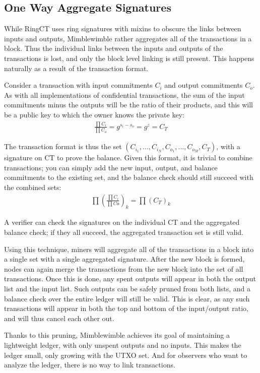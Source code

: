 \documentclass{article}
\begin{document}
\subsection{One Way Aggregate Signatures}

While RingCT uses ring signatures with mixins to obscure the links between inputs and outputs, Mimblewimble rather aggregates all of the transactions in a block.  Thus the individual links between the inputs and outputs of the transactions is lost, and only the block level linking is still present.  This happens naturally as a result of the transaction format.

Consider a transaction with input commitments $C_i$ and output commitments $C_o$.  As with all implementations of confidential transactions, the sum of the input commitments minus the outputs will be the ratio of their products, and this will be a public key to which the owner knows the private key:
\begin{align}
  \frac{\prod C_i}{\prod C_o} = g^{s_i - s_o} = g^z = C_T
\end{align}

The transaction format is thus the set $(C_{i_1}, ..., C_{i_N}, C_{o_1}, ..., C_{o_M}, C_T)$, with a signature on CT to prove the balance.  Given this format, it is trivial to combine transactions; you can simply add the new input, output, and balance commitments to the existing set, and the balance check should still succeed with the combined sets:
\begin{align}
  \prod (\frac{\prod C_i}{\prod Co})_k= \prod (C_T)_k
\end{align}

A verifier can check the signatures on the individual CT and the aggregated balance check; if they all succeed, the aggregated transaction set is still valid.

Using this technique, miners will aggregate all of the transactions in a block into a single set with a single aggregated signature.  After the new block is formed, nodes can again merge the transactions from the new block into the set of all transactions.  Once this is done, any spent outputs will appear in both the output list and the input list.  Such outputs can be safely pruned from both lists, and a balance check over the entire ledger will still be valid.  This is clear, as any such transactions will appear in both the top and bottom of the input/output ratio, and will thus cancel each other out.  

Thanks to this pruning, Mimblewimble achieves its goal of maintaining a lightweight ledger, with only unspent outputs and no inputs.  This makes the ledger small, only growing with the UTXO set.  And for observers who want to analyze the ledger, there is no way to link transactions.
\end{document}
